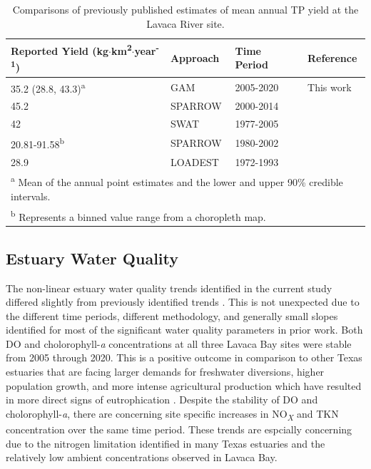 \documentclass[fleqn,10pt,lineno]{wlpeerj} %
\begin{document}
\begin{table}

\caption{\label{tab:table5}Comparisons of previously published estimates of mean annual TP yield at the Lavaca River site.}
\centering
\begin{tabular}[t]{llll}
\toprule
Reported Yield (kg$\cdot$km\textsuperscript{2}$\cdot$year\textsuperscript{-1}) & Approach & Time Period & Reference\\
\midrule
35.2 (28.8, 43.3)\textsuperscript{a} & GAM & 2005-2020 & This work\\
45.2 & SPARROW & 2000-2014 & \cite{wise_spatially_2019}\\
42 & SWAT & 1977-2005 & \cite{omaniEstimationSedimentNutrient2014}\\
20.81-91.58\textsuperscript{b} & SPARROW & 1980-2002 & \cite{rebichSourcesDeliveryNutrients2011}\\
28.9 & LOADEST & 1972-1993 & \cite{dunnTrendsNutrientInflows1996}\\
\bottomrule
\multicolumn{4}{l}{\rule{0pt}{1em}\textsuperscript{a} Mean of the annual point estimates and the lower and upper 90\% credible intervals.}\\
\multicolumn{4}{l}{\rule{0pt}{1em}\textsuperscript{b} Represents a binned value range from a choropleth map.}\\
\end{tabular}
\end{table}

\hypertarget{estuary-water-quality}{%
\subsection*{Estuary Water Quality}\label{estuary-water-quality}}

The non-linear estuary water quality trends identified in the current
study differed slightly from previously identified trends
\autocite{bugica_water_2020}. This is not unexpected due to the
different time periods, different methodology, and generally small
slopes identified for most of the significant water quality parameters
in prior work. Both DO and cholorophyll-\emph{a} concentrations at all
three Lavaca Bay sites were stable from 2005 through 2020. This is a
positive outcome in comparison to other Texas estuaries that are facing
larger demands for freshwater diversions, higher population growth, and
more intense agricultural production which have resulted in more direct
signs of eutrophication
\autocite{wetzWaterQualityDynamics2016,bugica_water_2020}. Despite the
stability of DO and cholorophyll-\emph{a}, there are concerning site
specific increases in NO\textsubscript{\emph{X}} and TKN concentration
over the same time period. These trends are espcially concerning due to
the nitrogen limitation identified in many Texas estuaries
\autocite{gardnerNitrogenFixationDissimilatory2006,houTransformationFateNitrate2012,doradoUnderstandingInteractionsFreshwater2015,paudelRelationshipSuspendedSolids2019,wetz_exceptionally_2017}
and the relatively low ambient concentrations observed in Lavaca Bay.
\end{document}
